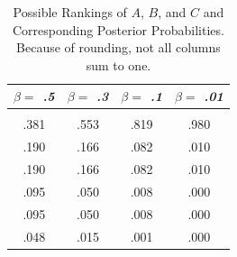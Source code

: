 \documentclass{asaproc}
\begin{document}
\begin{table}[b]
\caption{\enspace Possible Rankings of $A$, $B$, and $C$ and Corresponding 
Posterior Probabilities.  Because of rounding, not all columns sum to 
one.}\label{tab2}
\begin{tabular*}{\hsize}{@{\extracolsep{\fill}}cccc}
\\[-5pt]
\multicolumn{1}{c}{\it $\beta =$ .5} & 
\multicolumn{1}{c}{\it $\beta =$ .3} & 
\multicolumn{1}{c}{\it $\beta =$ .1} & 
\multicolumn{1}{c}{\it $\beta =$ .01}\\
\hline
\\[-5pt]
.381 & .553 & .819 & .980 \\ 
        .190 & .166 & .082 & .010 \\
        .190 & .166 & .082 & .010 \\
        .095 & .050 & .008 & .000 \\
         .095 &  .050 &  .008 &  .000 \\
         .048 &  .015 &  .001 &   .000 \\
\hline
\end{tabular*}
\end{table} 
\end{document}
